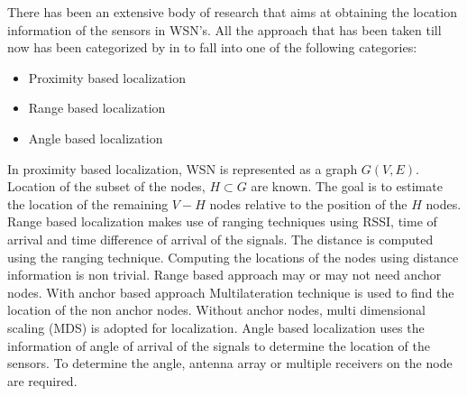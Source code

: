 
There has been an extensive body of research that aims at obtaining the location information of the sensors in WSN's. All the approach that has been taken till now has been categorized by \citeauthor{wang2010survey} in \cite{wang2010survey} to fall into one of the following categories:
\begin{itemize}
\item Proximity based localization
\item Range based localization
\item Angle based localization
\end{itemize}

In proximity based localization, WSN is represented as a graph $G(V,E)$. Location of the  subset of the nodes, $H \subset G$ are known. The goal is to estimate the location of the remaining $V-H$ nodes relative to the position of the $H$ nodes. 
Range based localization makes use of  ranging techniques using RSSI, time of arrival and time difference of arrival of the signals. The distance is computed using the ranging technique. Computing the locations of the nodes using distance information is non trivial. Range based approach may or may not need anchor nodes. With anchor based approach Multilateration technique is used to find the location of the non anchor nodes. Without anchor nodes, multi dimensional scaling (MDS) is adopted for localization. 
Angle based  localization uses the information of angle of arrival of the signals to determine the location of the sensors. To determine the angle, antenna array or multiple receivers on the node are required.

